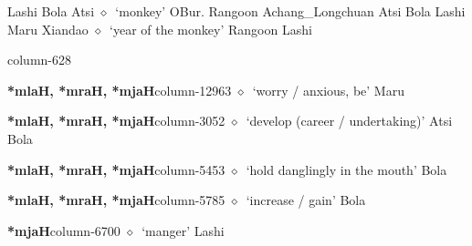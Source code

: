          Lashi 
\hspace{1ex}
         Bola 
\hspace{1ex}
         Atsi 
\hspace{1ex}
         $\diamond$~`monkey'
         OBur. 
\hspace{1ex}
         Rangoon 
\hspace{1ex}
         Achang\_Longchuan 
\hspace{1ex}
         Atsi 
\hspace{1ex}
         Bola 
\hspace{1ex}
         Lashi 
\hspace{1ex}
         Maru 
\hspace{1ex}
         Xiandao 
\hspace{1ex}
         $\diamond$~`year of the monkey'
         Rangoon 
\hspace{1ex}
         Lashi 
  \item {\footnotesize \textbf{}}{\tiny column-628}
  \item {\footnotesize \textbf{*mlaH, *mraH, *mjaH}}{\tiny column-12963}
         $\diamond$~`worry / anxious, be'
         Maru 
  \item {\footnotesize \textbf{*mlaH, *mraH, *mjaH}}{\tiny column-3052}
         $\diamond$~`develop (career / undertaking)'
         Atsi 
\hspace{1ex}
         Bola 
  \item {\footnotesize \textbf{*mlaH, *mraH, *mjaH}}{\tiny column-5453}
         $\diamond$~`hold danglingly in the mouth'
         Bola 
  \item {\footnotesize \textbf{*mlaH, *mraH, *mjaH}}{\tiny column-5785}
         $\diamond$~`increase / gain'
         Bola 
  \item {\footnotesize \textbf{*mjaH}}{\tiny column-6700}
         $\diamond$~`manger'
         Lashi 
